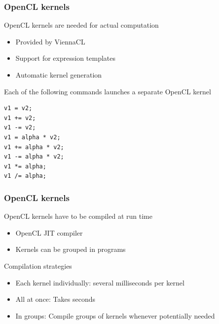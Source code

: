 \begin{frame}[fragile]
\frametitle{OpenCL kernels}

\begin{block}{OpenCL kernels are needed for actual computation}
  \begin{itemize}
   \item Provided by ViennaCL
   \item Support for expression templates
   \item Automatic kernel generation
  \end{itemize}
\end{block}

\begin{block}{Each of the following commands launches a separate OpenCL kernel}
\begin{lstlisting}
v1 = v2;
v1 += v2;
v1 -= v2;
v1 = alpha * v2;
v1 += alpha * v2;
v1 -= alpha * v2;
v1 *= alpha;
v1 /= alpha;
\end{lstlisting}
\end{block}

\end{frame}


\begin{frame}[fragile]
\frametitle{OpenCL kernels}

\begin{block}{OpenCL kernels have to be compiled at run time}
\begin{itemize}
  \item OpenCL JIT compiler
  \item Kernels can be grouped in programs
\end{itemize}
\end{block}

\begin{block}{Compilation strategies}
\begin{itemize}
  \item Each kernel individually: several milliseconds per kernel
  \item All at once: Takes seconds
  \item In groups: Compile groups of kernels whenever potentially needed
\end{itemize}
\end{block}

\end{frame}



